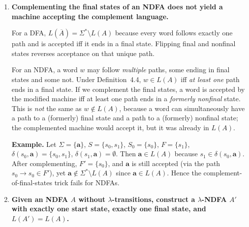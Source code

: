 \begin{enumerate}[{4.}1.]
\begin{enumerate}[(a)]
  \item \emph{Circuit diagram for the $\lambda$-free NDFA (with EOS, no SOS).}
  Apply the standard circuit encoding to the machine from part~(b).

  \item \emph{DFA (connected portion only).}
  Apply the subset construction to the NDFA from part~(b), starting from
  its set of initial states, and retain only the reachable portion.
\end{enumerate}

\item \textbf{Complementing the final states of an NDFA does not yield a machine
accepting the complement language.}

For a DFA, $L(\overline{A})=\Sigma^*\setminus L(A)$ because every word follows
exactly one path and is accepted iff it ends in a final state.  Flipping final
and nonfinal states reverses acceptance on that unique path.

For an NDFA, a word $w$ may follow \emph{multiple} paths, some ending in final
states and some not.  Under Definition~4.4, $w\in L(A)$ iff \emph{at least one}
path ends in a final state.  If we complement the final states, a word is
accepted by the modified machine iff at least one path ends in a \emph{formerly
nonfinal} state.  This is \emph{not} the same as $w\notin L(A)$, because a word
can simultaneously have a path to a (formerly) final state and a path to a
(formerly) nonfinal state; the complemented machine would accept it, but it was
already in $L(A)$.

\textbf{Example.}  Let $\Sigma=\{\pmb{a}\}$, $S=\{s_0,s_1\}$, $S_0=\{s_0\}$,
$F=\{s_1\}$, $\delta(s_0,\pmb{a})=\{s_0,s_1\}$, $\delta(s_1,\pmb{a})=\emptyset$.
Then $\pmb{a}\in L(A)$ because $s_1\in\delta(s_0,\pmb{a})$.  After complementing,
$F'=\{s_0\}$, and $\pmb{a}$ is still accepted (via the path $s_0\to s_0\in F'$),
yet $\pmb{a}\notin\Sigma^*\setminus L(A)$ since $\pmb{a}\in L(A)$.  Hence the
complement-of-final-states trick fails for NDFAs.

\item \textbf{Given an NDFA $A$ without $\lambda$-transitions, construct a
$\lambda$-NDFA $A'$ with exactly one start state, exactly one final state, and
$L(A')=L(A)$.}


\end{enumerate}
